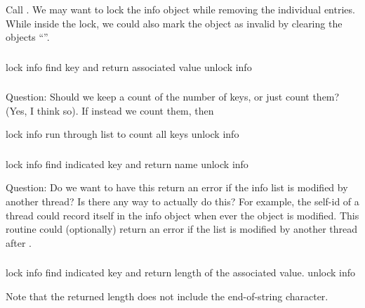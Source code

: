 \documentclass{article}
\begin{document}
\subsubsection{}
Call .  We may want to lock the info object
while removing the individual entries.  While inside the lock, we
could also mark the object as invalid by clearing the objects
``''. 

\subsubsection{}
\begin{algorithm}
lock info
find key and return associated value
unlock info
\end{algorithm}


\subsubsection{}
Question:  Should we keep a count of the number of keys, or just count them?
(Yes, I think so).  If instead we count them, then
\begin{algorithm}
lock info
run through list to count all keys
unlock info
\end{algorithm}

\subsubsection{}
\begin{algorithm}
lock info
find indicated key and return name
unlock info
\end{algorithm}

Question:  Do we want to have this return an error if the info list is 
modified by another thread?  Is there any way to actually do this?  For
example, the self-id of a thread could record itself in the info object when
ever the object is modified.  This routine could (optionally) return an error
if the list is modified by another thread after .

\subsubsection{}
\begin{algorithm}
lock info
find indicated key and return length of the associated value.
unlock info
\end{algorithm}
Note that the returned length does not include the end-of-string character.
\end{document}
